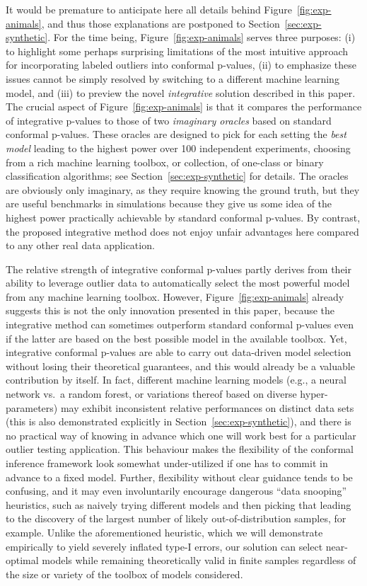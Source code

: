 \documentclass[11pt]{article}
\begin{document}
It would be premature to anticipate here all details behind Figure~\ref{fig:exp-animals}, and thus those explanations are postponed to Section~\ref{sec:exp-synthetic}. 
For the time being, Figure~\ref{fig:exp-animals} serves three purposes: (i) to highlight some perhaps surprising limitations of the most intuitive approach for incorporating labeled outliers into conformal p-values, (ii) to emphasize these issues cannot be simply resolved by switching to a different machine learning model, and (iii) to preview the novel {\em integrative} solution described in this paper.
The crucial aspect of Figure~\ref{fig:exp-animals} is that it compares the performance of integrative p-values to those of two {\em imaginary oracles} based on standard conformal p-values.
These oracles are designed to pick for each setting the {\em best model} leading to the highest power over 100 independent experiments, choosing from a rich machine learning toolbox, or collection, of one-class or binary classification algorithms; see Section~\ref{sec:exp-synthetic} for details. 
The oracles are obviously only imaginary, as they require knowing the ground truth, but they are useful benchmarks in simulations because they give us some idea of the highest power practically achievable by standard conformal p-values.
By contrast, the proposed integrative method does not enjoy unfair advantages here compared to any other real data application.

The relative strength of integrative conformal p-values partly derives from their ability to leverage outlier data to automatically select the most powerful model from any machine learning toolbox. However, Figure~\ref{fig:exp-animals} already suggests this is not the only innovation presented in this paper, because the integrative method can sometimes outperform standard conformal p-values even if the latter are based on the best possible model in the available toolbox.
Yet, integrative conformal p-values are able to carry out data-driven model selection without losing their theoretical guarantees, and this would already be a valuable contribution by itself. In fact, different machine learning models (e.g., a neural network vs.~a random forest, or variations thereof based on diverse hyper-parameters) may exhibit inconsistent relative performances on distinct data sets (this is also demonstrated explicitly in Section~\ref{sec:exp-synthetic}), and there is no practical way of knowing in advance which one will work best for a particular outlier testing application.
This behaviour makes the flexibility of the conformal inference framework look somewhat under-utilized if one has to commit in advance to a fixed model.
Further, flexibility without clear guidance tends to be confusing, and it may even involuntarily encourage dangerous ``data snooping'' heuristics, such as naively trying different models and then picking that leading to the discovery of the largest number of likely out-of-distribution samples, for example.
Unlike the aforementioned heuristic, which we will demonstrate empirically to yield severely inflated type-I errors, our solution can select near-optimal models while remaining theoretically valid in finite samples regardless of the size or variety of the toolbox of models considered.
\end{document}
